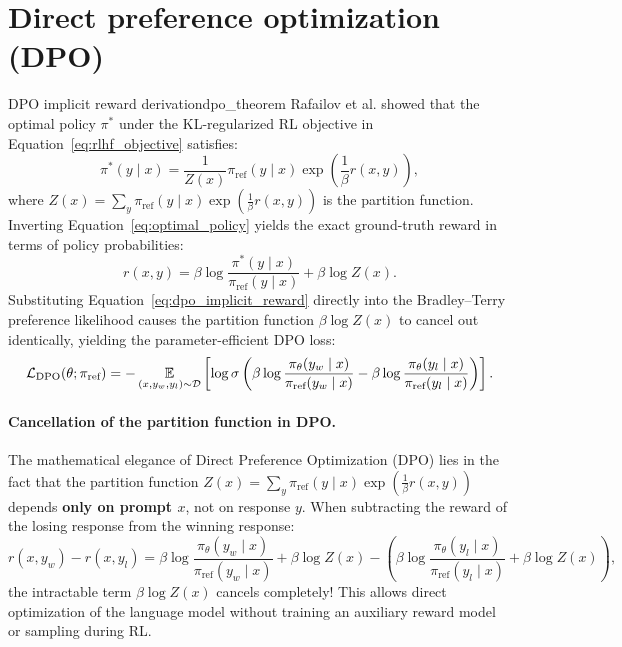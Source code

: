 \documentclass[../../main.tex]{subfiles}
\begin{document}
\section{Direct preference optimization (DPO)}
\begin{theorem}{DPO implicit reward derivation}{dpo_theorem}
Rafailov et al. \citep{rafailov2023} showed that the optimal policy $\pi^*$ under the KL-regularized RL objective in Equation~\eqref{eq:rlhf_objective} satisfies:
\begin{equation}
\label{eq:optimal_policy}
\pi^*(y \mid x) = \frac{1}{Z(x)} \pi_{\text{ref}}(y \mid x) \exp\left( \frac{1}{\beta} r(x, y) \right),
\end{equation}
where $Z(x) = \sum_y \pi_{\text{ref}}(y \mid x) \exp\left( \frac{1}{\beta} r(x, y) \right)$ is the partition function.
Inverting Equation~\eqref{eq:optimal_policy} yields the exact ground-truth reward in terms of policy probabilities:
\begin{equation}
\label{eq:dpo_implicit_reward}
r(x, y) = \beta \log \frac{\pi^*(y \mid x)}{\pi_{\text{ref}}(y \mid x)} + \beta \log Z(x).
\end{equation}
Substituting Equation~\eqref{eq:dpo_implicit_reward} directly into the Bradley--Terry preference likelihood causes the partition function $\beta \log Z(x)$ to cancel out identically, yielding the parameter-efficient DPO loss:
\begin{equation}
\mathcal{L}_{\text{DPO}}(\theta; \pi_{\text{ref}}) = -\operatorname*{\mathbb{E}}_{(x, y_w, y_l) \sim \mathcal{D}} \left[ \log \sigma\left( \beta \log \frac{\pi_\theta(y_w \mid x)}{\pi_{\text{ref}}(y_w \mid x)} - \beta \log \frac{\pi_\theta(y_l \mid x)}{\pi_{\text{ref}}(y_l \mid x)} \right) \right].
\end{equation}
\end{theorem}

\paragraph{Cancellation of the partition function in DPO.}
The mathematical elegance of Direct Preference Optimization (DPO) lies in the fact that the partition function $Z(x) = \sum_y \pi_{\text{ref}}(y \mid x) \exp(\frac{1}{\beta} r(x, y))$ depends \textbf{only on prompt $x$}, not on response $y$.
When subtracting the reward of the losing response from the winning response:
\[
r(x, y_w) - r(x, y_l) = \beta \log \frac{\pi_\theta(y_w \mid x)}{\pi_{\text{ref}}(y_w \mid x)} + \beta \log Z(x) - \left( \beta \log \frac{\pi_\theta(y_l \mid x)}{\pi_{\text{ref}}(y_l \mid x)} + \beta \log Z(x) \right),
\]
the intractable term $\beta \log Z(x)$ cancels completely! This allows direct optimization of the language model without training an auxiliary reward model or sampling during RL.
\end{document}
